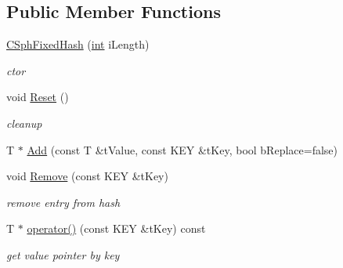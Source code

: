 \subsection*{Public Member Functions}
\begin{DoxyCompactItemize}
\item 
\hyperlink{classCSphFixedHash_a33a8410177a598bac8d1b8f68d9b3962}{C\-Sph\-Fixed\-Hash} (\hyperlink{sphinxexpr_8cpp_a4a26e8f9cb8b736e0c4cbf4d16de985e}{int} i\-Length)
\begin{DoxyCompactList}\small\item\em ctor \end{DoxyCompactList}\item 
void \hyperlink{classCSphFixedHash_a8642fda7c124ac8ed26859ffe22dd02d}{Reset} ()
\begin{DoxyCompactList}\small\item\em cleanup \end{DoxyCompactList}\item 
T $\ast$ \hyperlink{classCSphFixedHash_a7b53c2b5fc2d2b7b3b2888b1e2a31da9}{Add} (const T \&t\-Value, const K\-E\-Y \&t\-Key, bool b\-Replace=false)
\item 
void \hyperlink{classCSphFixedHash_a84717b4b2381056235cfc0aefb06afad}{Remove} (const K\-E\-Y \&t\-Key)
\begin{DoxyCompactList}\small\item\em remove entry from hash \end{DoxyCompactList}\item 
T $\ast$ \hyperlink{classCSphFixedHash_ab0c04cc7bacce731d67564dc7b18a656}{operator()} (const K\-E\-Y \&t\-Key) const 
\begin{DoxyCompactList}\small\item\em get value pointer by key \end{DoxyCompactList}\end{DoxyCompactItemize}
